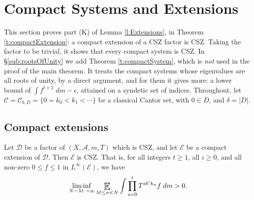 \section{Compact Systems and Extensions} \label{sec:compact}

This section proves part (K) of Lemma \ref{l:Extensions}, in Theorem \ref{t:compactExtension}: a compact extension of a CSZ factor is CSZ.  
Taking the factor to be trivial, it shows that every compact system is CSZ.  
In \S\ref{sub:rootsOfUnity} we add Theorem \ref{t:compactSystem}, which is \emph{not} used in the proof of the main theorem.  
It treats the compact systems whose eigenvalues are all roots of unity, by a direct argument, and for them it gives more: 
a lower bound of $\int f ^{t+1}\;dm - \epsilon$, attained on a syndetic set of indices.  
Throughout, let $\mathcal C = \mathcal C_{b,D} = \{0=k_0<k_1<\cdots\}$ be a classical Cantor set, with $0\in D$, and $\delta = \lvert D\rvert$.  


\subsection{Compact extensions} 

 
\begin{theorem} \label{t:compactExtension}
Let $\mathcal D$ be a factor of $(X, \mathcal A, m, T)$ which is CSZ, and let $\mathcal E$ be a compact extension of $\mathcal D$.  
Then $\mathcal E$ is CSZ.  That is, for all integers $t \geq 1$, all $i \geq 0$, and all 
non-zero $0\leq f\leq 1$ in $L ^{\infty}(\mathcal E)$, we have 
\begin{equation} \label{e:compactExtensionConclusion}
\liminf_{N-M\to\infty}  \Expectation_{M\leq n<N} 
\int \prod _{s=0}^{t} T ^{s b ^{i} k_n} f\;dm >0. 
\end{equation}
\end{theorem}

